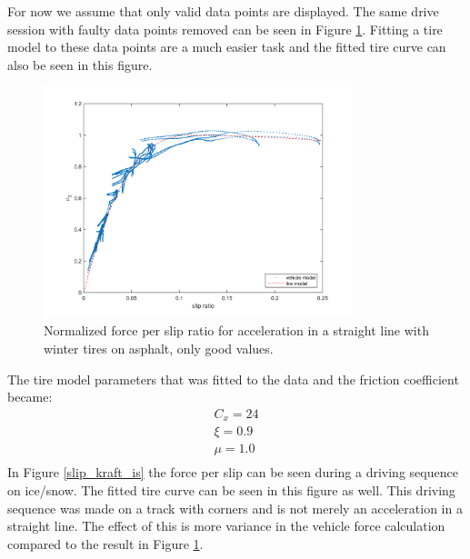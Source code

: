 For now we assume that only valid data points are displayed. The same drive session with faulty data points removed can be seen in Figure \ref{slip_kraft_ljungby}. Fitting a tire model to these data points are a much easier task and the fitted tire curve can also be seen in this figure.

\begin{figure}[h]
	\centering
	\includegraphics[width=0.8\textwidth]{Pictures/slip_kraft_ljungby}
	\caption {Normalized force per slip ratio for acceleration in a straight line with winter tires on asphalt, only good values.}
	\label{slip_kraft_ljungby}
\end{figure}

The tire model parameters that was fitted to the data and the friction coefficient became:
\begin{equation}
\label{winter_asphalt}
\begin{split}
C_{x} = 24 \\
\xi = 0.9 \\
\mu = 1.0 \\
\end{split}
\end{equation}
In Figure \ref{slip_kraft_is} the force per slip can be seen during a driving sequence on ice/snow. The fitted tire curve can be seen in this figure as well. This driving sequence was made on a track with corners and is not merely an acceleration in a straight line. The effect of this is more variance in the vehicle force calculation compared to the result in Figure \ref{slip_kraft_ljungby}. 

